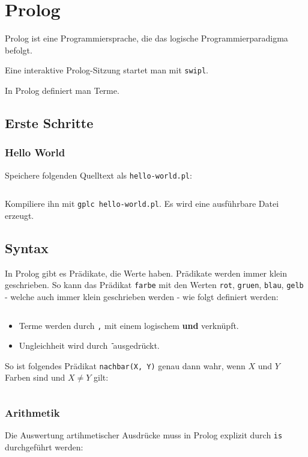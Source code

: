 \chapter{Prolog}

Prolog ist eine Programmiersprache, die das logische Programmierparadigma
befolgt.

Eine interaktive Prolog-Sitzung startet man mit \texttt{swipl}.

In Prolog definiert man Terme.
\section{Erste Schritte}
\subsection{Hello World}
Speichere folgenden Quelltext als \texttt{hello-world.pl}:
\inputminted[linenos, numbersep=5pt, tabsize=4, frame=lines, label=hello-world.hs]{prolog}{scripts/prolog/hello-world.pl}

Kompiliere ihn mit \texttt{gplc hello-world.pl}. Es wird eine
ausführbare Datei erzeugt.

\section{Syntax}
In Prolog gibt es Prädikate, die Werte haben. Prädikate werden immer klein geschrieben.
So kann das Prädikat \texttt{farbe} mit den Werten \texttt{rot}, \texttt{gruen},
\texttt{blau}, \texttt{gelb} - welche auch immer klein geschrieben werden - wie 
folgt definiert werden:

\inputminted[numbersep=5pt, tabsize=4]{prolog}{scripts/prolog/praedikat-farbe.pl}

\begin{itemize}
    \item Terme werden durch \texttt{,} mit einem logischem \textbf{und} verknüpft.
    \item Ungleichheit wird durch \texttt{\=} ausgedrückt.
\end{itemize}

So ist folgendes Prädikat \texttt{nachbar(X, Y)} genau dann wahr, wenn $X$
und $Y$ Farben sind und $X \neq Y$ gilt:

\inputminted[numbersep=5pt, tabsize=4]{prolog}{scripts/prolog/simple-term.pl}


\subsection{Arithmetik}
Die Auswertung artihmetischer Ausdrücke muss in Prolog explizit durch \texttt{is}
durchgeführt werden:

